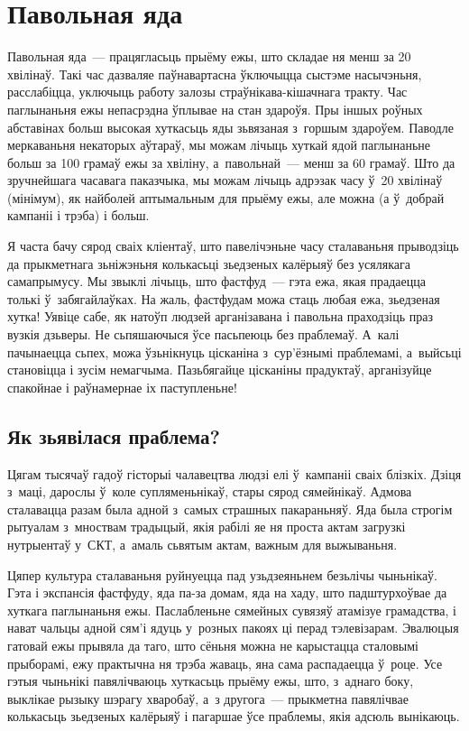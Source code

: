 \chapter{Павольная яда}

Павольная яда~--- працягласьць прыёму ежы, што складае ня менш за 20 хвілінаў. Такі час дазваляе паўнавартасна ўключыцца сыстэме насычэньня, расслабіцца, уключыць работу залозы страўнікава-кішачнага тракту. Час паглынаньня ежы непасрэдна ўплывае на стан здароўя. Пры іншых роўных абставінах больш высокая хуткасьць яды зьвязаная з~горшым здароўем. Паводле меркаваньня некаторых аўтараў, мы можам лічыць хуткай ядой паглынаньне больш за 100 грамаў ежы за хвіліну, а~павольнай~--- менш за 60 грамаў. Што да зручнейшага часавага паказчыка, мы можам лічыць адрэзак часу ў~20 хвілінаў (мінімум), як найболей аптымальным для прыёму ежы, але можна (а ў~добрай кампаніі і трэба) і больш.

Я часта бачу сярод сваіх кліентаў, што павелічэньне часу сталаваньня прыводзіць да прыкметнага зьніжэньня колькасьці зьедзеных калёрыяў без усялякага самапрымусу. Мы звыклі лічыць, што фастфуд~--- гэта ежа, якая прадаецца толькі ў~забягайлаўках. На жаль, фастфудам можа стаць любая ежа, зьедзеная хутка! Уявіце сабе, як натоўп людзей арганізавана і павольна праходзіць праз вузкія дзьверы. Не сьпяшаючыся ўсе пасьпеюць без праблемаў. А~калі пачынаецца сьпех, можа ўзьнікнуць цісканіна з~сур'ёзнымі праблемамі, а~выйсьці становіцца і зусім немагчыма. Пазьбягайце цісканіны прадуктаў, арганізуйце спакойнае і раўнамернае іх паступленьне!

\section{Як зьявілася праблема?}

Цягам тысячаў гадоў гісторыі чалавецтва людзі елі ў~кампаніі сваіх блізкіх. Дзіця з~маці, дарослы ў~коле супляменьнікаў, стары сярод сямейнікаў. Адмова сталавацца разам была адной з~самых страшных пакараньняў. Яда была строгім рытуалам з~мноствам традыцый, якія рабілі яе ня проста актам загрузкі нутрыентаў у~СКТ, а~амаль сьвятым актам, важным для выжываньня.

Цяпер культура сталаваньня руйнуецца пад узьдзеяньнем безьлічы чыньнікаў. Гэта і экспансія фастфуду, яда па-за домам, яда на хаду, што падштурхоўвае да хуткага паглынаньня ежы. Паслабленьне сямейных сувязяў атамізуе грамадства, і нават чальцы адной сям'і ядуць у~розных пакоях ці перад тэлевізарам. Эвалюцыя гатовай ежы прывяла да таго, што сёньня можна не карыстацца сталовымі прыборамі, ежу практычна ня трэба жаваць, яна сама распадаецца ў~роце. Усе гэтыя чыньнікі павялічваюць хуткасьць прыёму ежы, што, з~аднаго боку, выклікае рызыку шэрагу хваробаў, а~з другога~--- прыкметна павялічвае колькасьць зьедзеных калёрыяў і пагаршае ўсе праблемы, якія адсюль вынікаюць.

